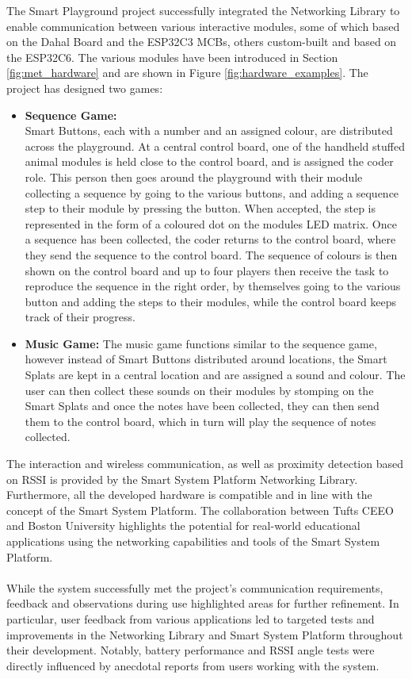 The Smart Playground project successfully integrated the Networking Library to enable communication between various interactive modules, some of which based on the Dahal Board and the ESP32C3 MCBs, others custom-built and based on the ESP32C6. The various modules have been introduced in Section \ref{fig:met_hardware} and are shown in Figure \ref{fig:hardware_examples}. The project has designed two games:
\begin{itemize}
    \item \textbf{Sequence Game:}\\
    Smart Buttons, each with a number and an assigned colour, are distributed across the playground. At a central control board, one of the handheld stuffed animal modules is held close to the control board, and is assigned the coder role. This person then goes around the playground with their module collecting a sequence by going to the various buttons, and adding a sequence step to their module by pressing the button. When accepted, the step is represented in the form of a coloured dot on the modules LED matrix. Once a sequence has been collected, the coder returns to the control board, where they send the sequence to the control board. The sequence of colours is then shown on the control board and up to four players then receive the task to reproduce the sequence in the right order, by themselves going to the various button and adding the steps to their modules, while the control board keeps track of their progress.
    \item \textbf{Music Game:}
    The music game functions similar to the sequence game, however instead of Smart Buttons distributed around locations, the Smart Splats are kept in a central location and are assigned a sound and colour. The user can then collect these sounds on their modules by stomping on the Smart Splats and once the notes have been collected, they can then send them to the control board, which in turn will play the sequence of notes collected.
\end{itemize}
The interaction and wireless communication, as well as proximity detection based on RSSI is provided by the Smart System Platform Networking Library. Furthermore, all the developed hardware is compatible and in line with the concept of the Smart System Platform. The collaboration between Tufts CEEO and Boston University highlights the potential for real-world educational applications using the networking capabilities and tools of the Smart System Platform.\\\\
While the system successfully met the project's communication requirements, feedback and observations during use highlighted areas for further refinement. In particular, user feedback from various applications led to targeted tests and improvements in the Networking Library and Smart System Platform throughout their development. Notably, battery performance and RSSI angle tests were directly influenced by anecdotal reports from users working with the system.

